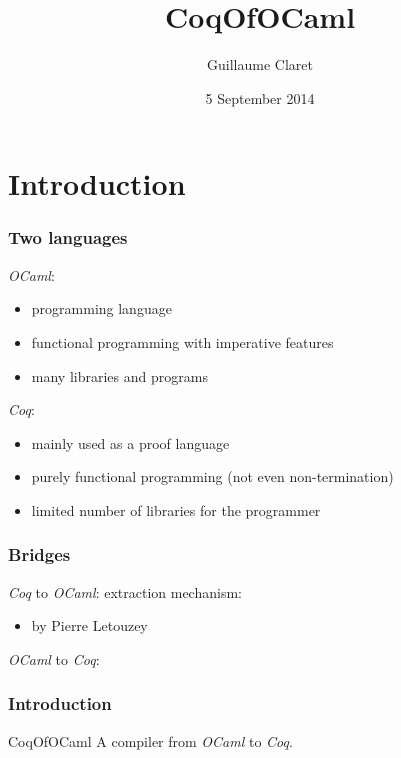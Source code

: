 \documentclass[hyperref={pdfpagelabels=false}]{beamer}
\begin{document}
  \title{CoqOfOCaml}
  \author{Guillaume Claret}
  \date{5 September 2014}
  \maketitle

  \section{Introduction}
  \begin{frame}
    \frametitle{Two languages}
    \emph{OCaml}:
    \begin{itemize}
      \item programming language
      \item functional programming with imperative features
      \item many libraries and programs
    \end{itemize}
    \emph{Coq}:
    \begin{itemize}
      \item mainly used as a proof language
      \item purely functional programming (not even non-termination)
      \item limited number of libraries for the programmer
    \end{itemize}
  \end{frame}
  \begin{frame}
    \frametitle{Bridges}
    \emph{Coq} to \emph{OCaml}: extraction mechanism:
    \begin{itemize}
      \item by Pierre Letouzey
    \end{itemize}

    \emph{OCaml} to \emph{Coq}:
  \end{frame}
  \begin{frame}
    \frametitle{Introduction}
    \begin{block}{CoqOfOCaml}
      A compiler from \emph{OCaml} to \emph{Coq}.
    \end{block}
  \end{frame}
\end{document}
